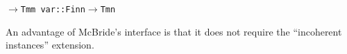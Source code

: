 \documentclass[9pt,preprint,authoryear]{sigplanconf}
\begin{document}
{{{}\vphantom{$\{$}}}\textcolor[rgb]{0,0,0.80}{\texttt{\mbox{\hspace{0.50em}}}}\textcolor[rgb]{0,0,0.80}{\texttt{\mbox{\hspace{0.50em}}}}\textcolor[rgb]{0,0,0.80}{\texttt{\mbox{\hspace{0.50em}}}}\textcolor[rgb]{0,0,0.80}{\texttt{\mbox{\hspace{0.50em}}}}\textcolor[rgb]{0,0,0.80}{\texttt{\mbox{\hspace{0.50em}}}}\textcolor[rgb]{0,0,0.80}{\texttt{\mbox{\hspace{0.50em}}}}\textcolor[rgb]{0,0,0.80}{\texttt{\mbox{\hspace{0.50em}}}}\textcolor[cmyk]{0,0.65,0.99,0}{\texttt{$ \rightarrow $}}\textcolor[rgb]{0,0,0.80}{\texttt{\mbox{\hspace{0.50em}}}}\textcolor[rgb]{0,0,0.80}{\texttt{Tm}}\textcolor[rgb]{0,0,0.80}{\texttt{\mbox{\hspace{0.50em}}}}\textcolor[rgb]{0,0,0.80}{\texttt{m}}\textcolor[rgb]{0,0,0.80}{\texttt{{\nopagebreak \newline%
}\vphantom{$\{$}}}\textcolor[rgb]{0,0,0.80}{\texttt{var}}\textcolor[rgb]{0,0,0.80}{\texttt{\mbox{\hspace{0.50em}}}}\textcolor[cmyk]{0,0.65,0.99,0}{\texttt{{:}{:}}}\textcolor[rgb]{0,0,0.80}{\texttt{\mbox{\hspace{0.50em}}}}\textcolor[rgb]{0,0,0.80}{\texttt{Fin}}\textcolor[rgb]{0,0,0.80}{\texttt{\mbox{\hspace{0.50em}}}}\textcolor[rgb]{0,0,0.80}{\texttt{n}}\textcolor[rgb]{0,0,0.80}{\texttt{\mbox{\hspace{0.50em}}}}\textcolor[cmyk]{0,0.65,0.99,0}{\texttt{$ \rightarrow $}}\textcolor[rgb]{0,0,0.80}{\texttt{\mbox{\hspace{0.50em}}}}\textcolor[rgb]{0,0,0.80}{\texttt{Tm}}\textcolor[rgb]{0,0,0.80}{\texttt{\mbox{\hspace{0.50em}}}}\textcolor[rgb]{0,0,0.80}{\texttt{n}}\textcolor[rgb]{0,0,0.80}{\texttt{{\nopagebreak \newline%
}\vphantom{$\{$}}}%


%
%


%
An advantage of McBride{'}s interface is that it does not require the
    {``}incoherent instances{''} extension. %
\end{document}
